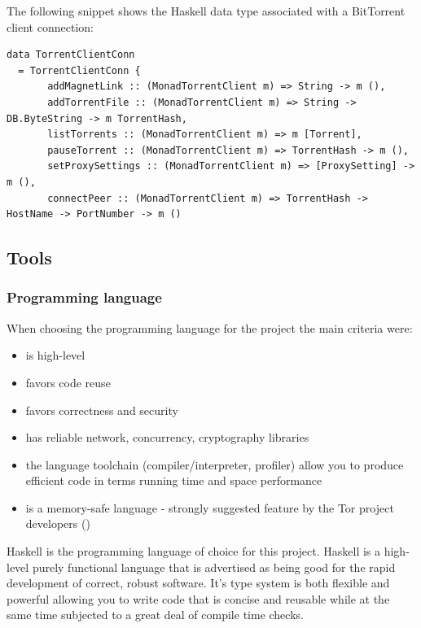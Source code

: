 \documentclass[11pt]{article} %
\begin{document}
The following snippet shows the Haskell  data type associated with a BitTorrent client connection: 

\begin{lstlisting}
data TorrentClientConn
  = TorrentClientConn {
       addMagnetLink :: (MonadTorrentClient m) => String -> m (),
       addTorrentFile :: (MonadTorrentClient m) => String -> DB.ByteString -> m TorrentHash,
       listTorrents :: (MonadTorrentClient m) => m [Torrent],
       pauseTorrent :: (MonadTorrentClient m) => TorrentHash -> m (),
       setProxySettings :: (MonadTorrentClient m) => [ProxySetting] -> m (),
       connectPeer :: (MonadTorrentClient m) => TorrentHash -> HostName -> PortNumber -> m ()
\end{lstlisting}

\subsection{Tools}


\subsubsection{Programming language}

When choosing the programming language for the project the main criteria were:

\begin{itemize}
\item is high-level
\item favors code reuse
\item favors correctness and security
\item has reliable network, concurrency, cryptography libraries
\item the language toolchain (compiler/interpreter, profiler) allow you to produce efficient code in terms running time and space performance
\item is a memory-safe language - strongly suggested feature by the Tor project developers (\citep*{web:torPluggableTransports})
\end{itemize}

Haskell is the programming language of choice for this project. Haskell is a high-level purely functional language that is advertised as being good for the rapid development of correct, robust software. It's type system is both flexible and powerful allowing you to write code that is concise and reusable while at the same time subjected to a great deal of compile time checks.
\end{document}
